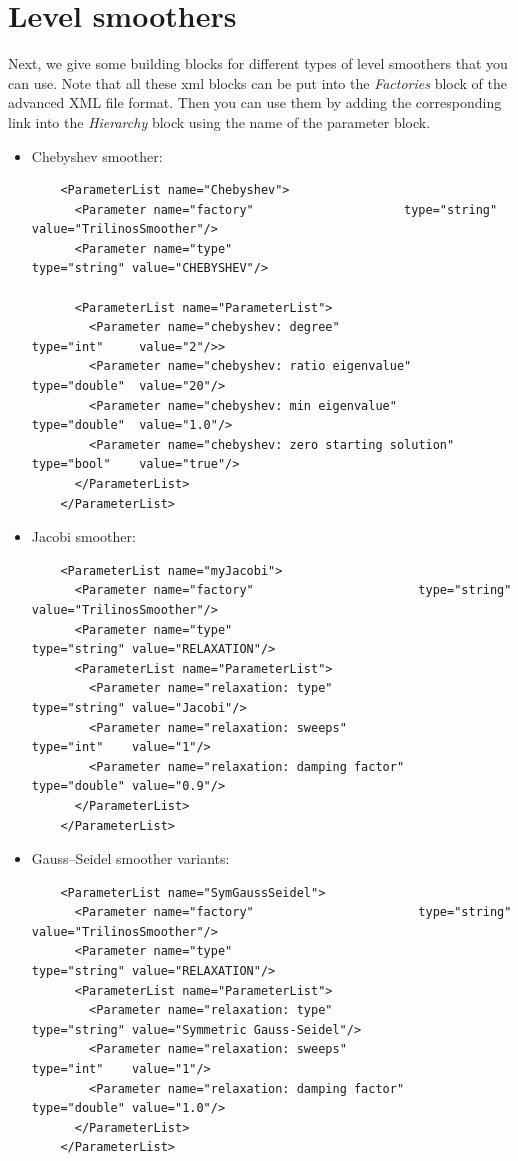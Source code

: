 \documentclass[10pt,fleqn]{book}
\begin{document}
\section{Level smoothers}
Next, we give some building blocks for different types of level smoothers that you can use. Note that all these xml blocks can be put into the \textit{Factories} block of the advanced \muelu XML file format. Then you can use them by adding the corresponding link into the \textit{Hierarchy} block using the name of the parameter block.

\begin{itemize}

\item Chebyshev smoother:
\begin{lstlisting}
    <ParameterList name="Chebyshev">
      <Parameter name="factory"                     type="string" value="TrilinosSmoother"/>
      <Parameter name="type"                               type="string" value="CHEBYSHEV"/>

      <ParameterList name="ParameterList">
        <Parameter name="chebyshev: degree"                 type="int"     value="2"/>>
        <Parameter name="chebyshev: ratio eigenvalue"       type="double"  value="20"/>
        <Parameter name="chebyshev: min eigenvalue"         type="double"  value="1.0"/>
        <Parameter name="chebyshev: zero starting solution" type="bool"    value="true"/>
      </ParameterList>
    </ParameterList>
\end{lstlisting}
\item Jacobi smoother:
\begin{lstlisting}
    <ParameterList name="myJacobi">
      <Parameter name="factory"                       type="string" value="TrilinosSmoother"/>
      <Parameter name="type"                                type="string" value="RELAXATION"/>
      <ParameterList name="ParameterList">
        <Parameter name="relaxation: type"                  type="string" value="Jacobi"/>
        <Parameter name="relaxation: sweeps"                type="int"    value="1"/>
        <Parameter name="relaxation: damping factor"        type="double" value="0.9"/>
      </ParameterList>
    </ParameterList>
\end{lstlisting}
\item Gauss--Seidel smoother variants:
\begin{lstlisting}
    <ParameterList name="SymGaussSeidel">
      <Parameter name="factory"                       type="string" value="TrilinosSmoother"/>
      <Parameter name="type"                                type="string" value="RELAXATION"/>
      <ParameterList name="ParameterList">
        <Parameter name="relaxation: type"                  type="string" value="Symmetric Gauss-Seidel"/>
        <Parameter name="relaxation: sweeps"                type="int"    value="1"/>
        <Parameter name="relaxation: damping factor"        type="double" value="1.0"/>
      </ParameterList>
    </ParameterList>
\end{lstlisting}


\end{itemize}
\end{document}
